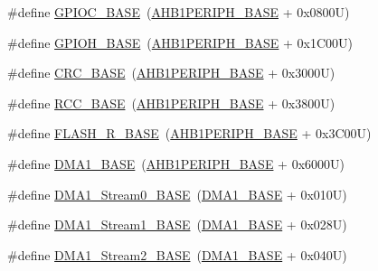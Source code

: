 \begin{DoxyCompactItemize}
\item 
\#define \hyperlink{group___peripheral__registers__structures_ga26f267dc35338eef219544c51f1e6b3f}{G\+P\+I\+O\+C\+\_\+\+B\+A\+SE}~(\hyperlink{group___peripheral__memory__map_ga811a9a4ca17f0a50354a9169541d56c4}{A\+H\+B1\+P\+E\+R\+I\+P\+H\+\_\+\+B\+A\+SE} + 0x0800\+U)
\item 
\#define \hyperlink{group___peripheral__registers__structures_gaee4716389f3a1c727495375b76645608}{G\+P\+I\+O\+H\+\_\+\+B\+A\+SE}~(\hyperlink{group___peripheral__memory__map_ga811a9a4ca17f0a50354a9169541d56c4}{A\+H\+B1\+P\+E\+R\+I\+P\+H\+\_\+\+B\+A\+SE} + 0x1\+C00\+U)
\item 
\#define \hyperlink{group___peripheral__registers__structures_ga656a447589e785594cbf2f45c835ad7e}{C\+R\+C\+\_\+\+B\+A\+SE}~(\hyperlink{group___peripheral__memory__map_ga811a9a4ca17f0a50354a9169541d56c4}{A\+H\+B1\+P\+E\+R\+I\+P\+H\+\_\+\+B\+A\+SE} + 0x3000\+U)
\item 
\#define \hyperlink{group___peripheral__registers__structures_ga0e681b03f364532055d88f63fec0d99d}{R\+C\+C\+\_\+\+B\+A\+SE}~(\hyperlink{group___peripheral__memory__map_ga811a9a4ca17f0a50354a9169541d56c4}{A\+H\+B1\+P\+E\+R\+I\+P\+H\+\_\+\+B\+A\+SE} + 0x3800\+U)
\item 
\#define \hyperlink{group___peripheral__registers__structures_ga8e21f4845015730c5731763169ec0e9b}{F\+L\+A\+S\+H\+\_\+\+R\+\_\+\+B\+A\+SE}~(\hyperlink{group___peripheral__memory__map_ga811a9a4ca17f0a50354a9169541d56c4}{A\+H\+B1\+P\+E\+R\+I\+P\+H\+\_\+\+B\+A\+SE} + 0x3\+C00\+U)
\item 
\#define \hyperlink{group___peripheral__registers__structures_gab2d8a917a0e4ea99a22ac6ebf279bc72}{D\+M\+A1\+\_\+\+B\+A\+SE}~(\hyperlink{group___peripheral__memory__map_ga811a9a4ca17f0a50354a9169541d56c4}{A\+H\+B1\+P\+E\+R\+I\+P\+H\+\_\+\+B\+A\+SE} + 0x6000\+U)
\item 
\#define \hyperlink{group___peripheral__registers__structures_ga0d3c52aa35dcc68f78b704dfde57ba95}{D\+M\+A1\+\_\+\+Stream0\+\_\+\+B\+A\+SE}~(\hyperlink{group___peripheral__memory__map_gab2d8a917a0e4ea99a22ac6ebf279bc72}{D\+M\+A1\+\_\+\+B\+A\+SE} + 0x010\+U)
\item 
\#define \hyperlink{group___peripheral__registers__structures_ga5b4152cef577e37eccc9311d8bdbf3c2}{D\+M\+A1\+\_\+\+Stream1\+\_\+\+B\+A\+SE}~(\hyperlink{group___peripheral__memory__map_gab2d8a917a0e4ea99a22ac6ebf279bc72}{D\+M\+A1\+\_\+\+B\+A\+SE} + 0x028\+U)
\item 
\#define \hyperlink{group___peripheral__registers__structures_ga48a551ee91d3f07dd74347fdb35c703d}{D\+M\+A1\+\_\+\+Stream2\+\_\+\+B\+A\+SE}~(\hyperlink{group___peripheral__memory__map_gab2d8a917a0e4ea99a22ac6ebf279bc72}{D\+M\+A1\+\_\+\+B\+A\+SE} + 0x040\+U)

\end{DoxyCompactItemize}
